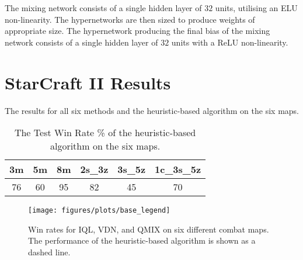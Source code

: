 \documentclass{article}
\begin{document}
The mixing network consists of a single hidden layer of $32$ units, utilising an ELU non-linearity. The hypernetworks are then sized to produce weights of appropriate size. The hypernetwork producing the final bias of the mixing network consists of a single hidden layer of $32$ units with a ReLU non-linearity.
 \section{StarCraft II Results}

The results for all six methods and the heuristic-based algorithm on the six maps.

\begin{table}[h]
	\setlength{\extrarowheight}{3pt}
	\centering
    \begin{center}
        \begin{tabular}{| c | c | c | c | c | c |}
        \hline
        \textbf{3m} & \textbf{5m} & \textbf{8m} & \textbf{2s\_3z} & \textbf{3s\_5z} & \textbf{1c\_3s\_5z} \\
        \hline
        76 & 60 & 95 & 82 & 45 & 70 \\ 
        \hline
        \end{tabular}
    \end{center}
    \caption{The Test Win Rate \% of the heuristic-based algorithm on the six maps.}
\end{table}

\begin{figure*}[htb!]
    \centering
    \texttt{[image: figures/plots/base\_legend]}
    \vfill
    \\
    \caption{Win rates for IQL, VDN, and QMIX on six different combat maps. The performance of the heuristic-based algorithm is shown as a dashed line.}
\end{figure*}
\end{document}
